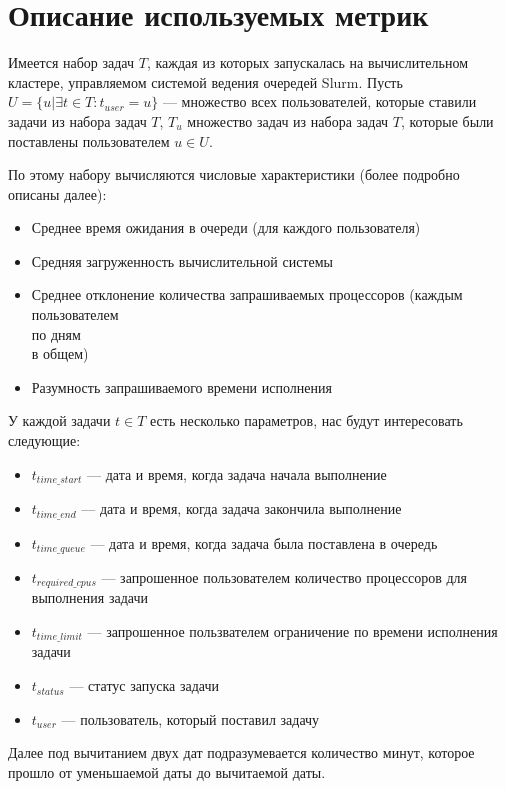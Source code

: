 \documentclass[12pt]{article}
\begin{document}
\thispagestyle{empty}

\section{Описание используемых метрик}
	Имеется набор задач $T$, каждая из которых запускалась на вычислительном кластере, управляемом системой ведения очередей Slurm.
	Пусть $U = \{u | \exists t \in T: t_{user} = u\}$ --- множество всех пользователей, которые ставили задачи из набора задач $T$,
	$T_u$ множество задач из набора задач $T$, которые были поставлены пользователем $u \in U$. 
	
	По этому набору вычисляются числовые характеристики (более подробно описаны далее):
	\begin{itemize}
		\item Среднее время ожидания в очереди (для каждого пользователя)
		\item Средняя загруженность вычислительной системы
		\item Среднее отклонение количества запрашиваемых процессоров (каждым пользователем\\по дням\\в общем)
		\item Разумность запрашиваемого времени исполнения
	\end{itemize}
	
	У каждой задачи $t \in T$ есть несколько параметров, нас будут интересовать следующие:
	\begin{itemize}
		\item $t_{time\_start}$ --- дата и время, когда задача начала выполнение
		\item $t_{time\_end}$ --- дата и время, когда задача закончила выполнение
		\item $t_{time\_queue}$ --- дата и время, когда задача была поставлена в очередь
		\item $t_{required\_cpus}$ --- запрошенное пользователем количество процессоров для выполнения задачи
		\item $t_{time\_limit}$ --- запрошенное пользвателем ограничение по времени исполнения задачи
		\item $t_{status}$ --- статус запуска задачи
		\item $t_{user}$ --- пользователь, который поставил задачу
	\end{itemize}
	
	Далее под вычитанием двух дат подразумевается количество минут, которое прошло от уменьшаемой даты до вычитаемой даты.
	
\end{document}
